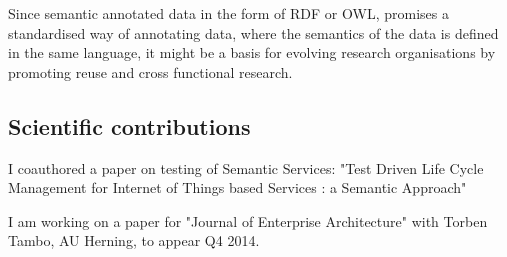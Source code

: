 Since semantic annotated data in the form of RDF or OWL, promises a standardised way of annotating data, where the semantics of the data is defined in the same language, it might be a basis for evolving research organisations by promoting reuse and cross functional research.

\subsection{Scientific contributions}

I coauthored a paper on testing of Semantic Services: "Test Driven Life Cycle Management for Internet of Things based Services : a Semantic Approach" \cite{Reetz}

I am working on a paper for "Journal of Enterprise Architecture" with Torben Tambo, AU Herning, to appear Q4 2014.
